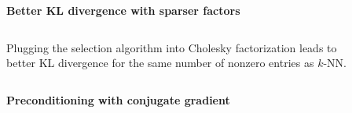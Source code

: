 \documentclass{beamer}                             %
\newcommand{\blocktitle}[1]{{\Large \textbf{#1}}}
\begin{document}
\begin{frame}[t]
\begin{columns}[T]
\begin{column}{0.30\textwidth}
  \begin{tcolorbox}
    \blocktitle{Better KL divergence with sparser factors}

    \begin{columns}
      \begin{column}{0.5\textwidth}
        Plugging the selection algorithm into Cholesky
        factorization leads to better KL divergence for
        the same number of nonzero entries as \( k \)-NN.
      \end{column}
      \begin{column}{0.5\textwidth}
        \begin{figure}[t]
          \centering
          
          \label{fig:chol_rho}
        \end{figure}
      \end{column}
    \end{columns}
  \end{tcolorbox}

  \begin{tcolorbox}
    \blocktitle{Preconditioning with conjugate gradient}


\end{tcolorbox}
\end{column}
\end{columns}
\end{frame}
\end{document}
